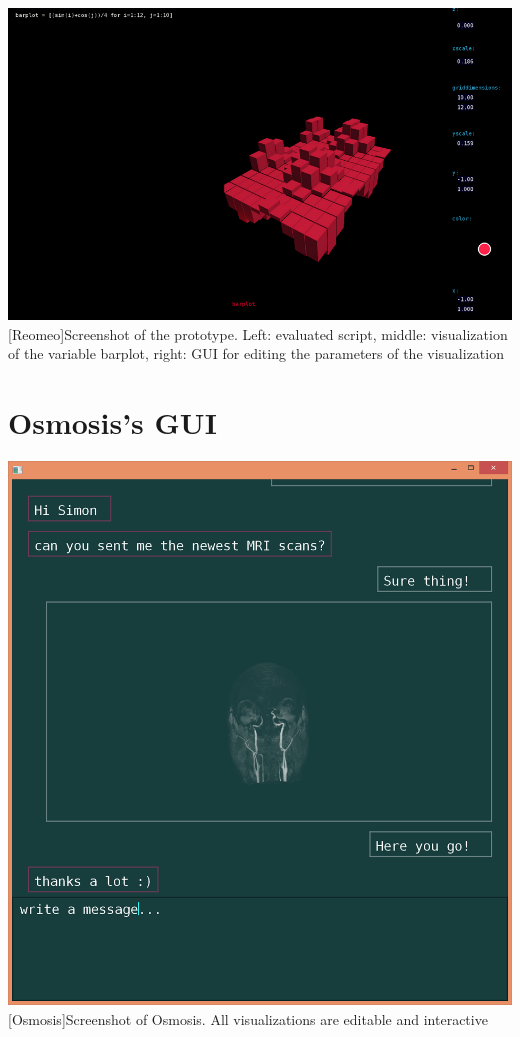 \begin{appendix}
\begin{minipage}{\linewidth}
    \centering
    \includegraphics[scale=2.0]{graphics/screenshot.png}
    [Reomeo]{Screenshot of the prototype. Left: evaluated script, middle: visualization of the variable barplot, right: GUI for editing the parameters of the visualization}
    \label{app:screenshot}
\end{minipage}

\section{Osmosis's GUI}

\begin{minipage}{\linewidth}
    \centering
    \includegraphics[scale=0.2]{graphics/osmosis.png}
    [Osmosis]{Screenshot of Osmosis. All visualizations are editable and interactive}
    \label{app:osmosis}
\end{minipage}



\end{appendix}
